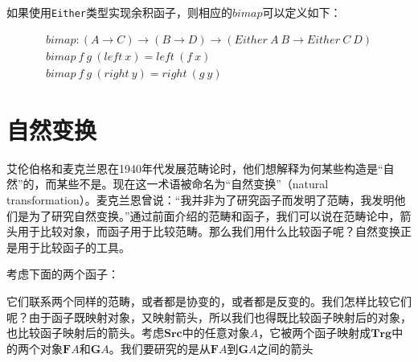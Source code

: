 \documentclass{article}
\begin{document}
如果使用\texttt{Either}类型实现余积函子，则相应的$bimap$可以定义如下：

\[
\begin{array}{l}
bimap : (A \to C) \to (B \to D) \to (Either\ A\ B \to Either\ C\ D) \\
bimap\ f\ g\ (left\ x) = left\ (f\ x) \\
bimap\ f\ g\ (right\ y) = right\ (g\ y)
\end{array}
\]

\begin{Exercise}
\end{Exercise}

\section{自然变换}

艾伦伯格和麦克兰恩在1940年代发展范畴论时，他们想解释为何某些构造是“自然”的，而某些不是。现在这一术语被命名为“自然变换”（natural transformation）。麦克兰恩曾说：“我并非为了研究函子而发明了范畴，我发明他们是为了研究自然变换。”通过前面介绍的范畴和函子，我们可以说在范畴论中，箭头用于比较对象，而函子用于比较范畴。那么我们用什么比较函子呢？自然变换正是用于比较函子的工具。


考虑下面的两个函子：

\begin{center}
\end{center}

它们联系两个同样的范畴，或者都是协变的，或者都是反变的。我们怎样比较它们呢？由于函子既映射对象，又映射箭头，所以我们也得既比较函子映射后的对象，也比较函子映射后的箭头。考虑$\pmb{Src}$中的任意对象$A$，它被两个函子映射成$\pmb{Trg}$中的两个对象$\mathbf{F}A$和$\mathbf{G}A$。我们要研究的是从$\mathbf{F}A$到$\mathbf{G}A$之间的箭头
\end{document}
